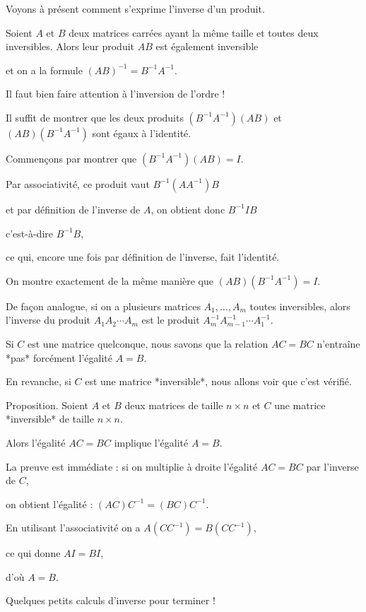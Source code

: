 \diapo

Voyons à présent comment s'exprime l'inverse d'un produit.

Soient $A$ et $B$ deux matrices carrées ayant la même taille et toutes deux inversibles. 
Alors leur produit $AB$ est également inversible 

\change
et on a la formule $\displaystyle (AB)^{-1} = B^{-1} A^{-1}$.

\change
Il faut bien faire attention à l'inversion de l'ordre !

\change
Il suffit de montrer que les deux produits $(B^{-1}A^{-1}) (AB) $ et $(AB) (B^{-1} A^{-1}) $ sont égaux à l'identité. 

Commençons par montrer que $(B^{-1}A^{-1}) (AB) =I$.

\change
Par associativité, ce produit vaut $B^{-1}(AA^{-1})B$

\change
et par définition de l'inverse de $A$, on obtient donc $ B^{-1}IB$

\change
c'est-à-dire $B^{-1}B$,

\change
ce qui, encore une fois par définition de l'inverse, fait l'identité.

\change
On montre exactement de la même manière que  $ (AB)(B^{-1} A^{-1})  =I$.
 
\change
De façon analogue, si on a plusieurs matrices $A_1, \dots , A_m$ toutes inversibles, alors l'inverse du produit
$A_1 A_2 \cdots A_m$ est le produit $A_m^{-1} A_{m-1}^{-1} \cdots A^{-1}_1$.


\diapo

Si $C$ est une matrice quelconque, nous savons que la relation  $AC=BC$
 n'entraîne *pas* forcément l'égalité $A=B$.

En revanche, si $C$ est une matrice *inversible*, nous allons voir que c'est vérifié.

\change
Proposition. Soient $A$ et $B$ deux matrices de taille $n\times n$ et $C$ une matrice
*inversible* de taille $n\times n$.

\change
Alors l'égalité $AC=BC$ implique l'égalité $A=B$.

\change
La preuve est immédiate : si on multiplie à droite l'égalité $AC=BC$ par l'inverse de $C$, 

\change
on obtient l'égalité : $(AC)C^{-1}=(BC)C^{-1}$. 

\change
En utilisant l'associativité on a $A(CC^{-1})=B(CC^{-1})$,

\change
ce qui donne $AI=BI$, 

\change
d'où $A=B$.



\diapo

Quelques petits calculs d'inverse pour terminer !



